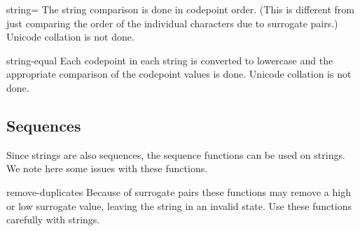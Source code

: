 \begin{defun}{}{string=}{\args {}  }
  The string comparison is done in codepoint order.  (This is
  different from just comparing the order of the individual characters
  due to surrogate pairs.)  Unicode collation is not done.
\end{defun}

\begin{defun}{}{string-equal}{\args {}  }
  Each codepoint in each string is converted to lowercase and the
  appropriate comparison of the codepoint values is done.  Unicode
  collation is not done.
\end{defun}


\subsection{Sequences}

Since strings are also sequences, the sequence functions can be used
on strings.  We note here some issues with these functions.

\begin{defun}{}{remove-duplicates}{\args {}
    }
  Because of surrogate pairs these functions may remove a high or low
  surrogate value, leaving the string in an invalid state.  Use these
  functions carefully with strings.
\end{defun}


